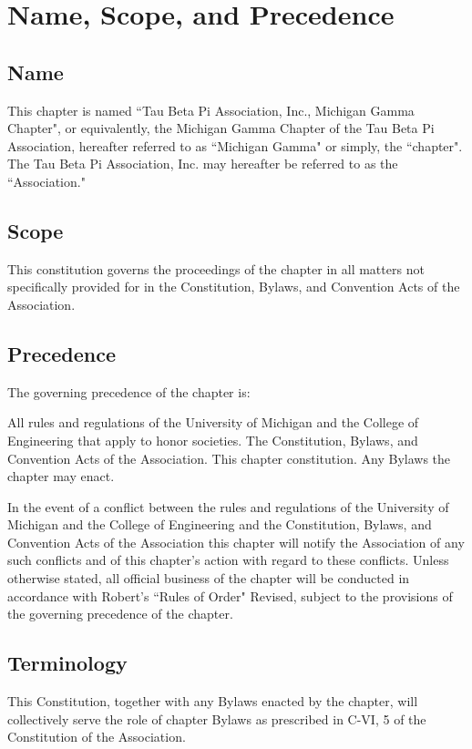 \chapter{Name, Scope, and Precedence}

\section{Name}
This chapter is named ``Tau Beta Pi Association, Inc., Michigan Gamma Chapter", or equivalently, the Michigan Gamma Chapter of the Tau Beta Pi Association, hereafter referred to as ``Michigan Gamma" or simply, the ``chapter". The Tau Beta Pi Association, Inc. may hereafter be referred to as the ``Association."

\section{Scope}
This constitution governs the proceedings of the chapter in all matters not specifically provided for in the Constitution, Bylaws, and Convention Acts of the Association.
\section{Precedence} The governing precedence of the chapter is:

\begin{compactenum}[1.]
\itemnotoc  All rules and regulations of the University of Michigan and the College of Engineering that apply to honor societies.
\itemnotoc  The Constitution, Bylaws, and Convention Acts of the Association.
\itemnotoc This chapter constitution.
\itemnotoc Any Bylaws the chapter may enact.
\end{compactenum}

In the event of a conflict between  the rules and regulations of the University of Michigan and the College of Engineering and the Constitution, Bylaws, and Convention Acts of the Association this chapter will notify the Association of any such conflicts and of this chapter's action with regard to these conflicts. Unless otherwise stated, all official business of the chapter will  be conducted in accordance with Robert's ``Rules of Order" Revised, subject to the provisions of the governing precedence of the chapter.

\section{Terminology} This Constitution, together with any Bylaws enacted by the chapter, will collectively serve the role of chapter Bylaws as prescribed in C-VI, 5 of the Constitution of the Association.